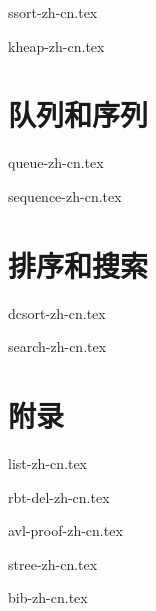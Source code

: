\documentclass[zihao=5, b5paper, twoside, heading=true]{ctexbook}
\begin{document}
{ssort-zh-cn.tex}

{kheap-zh-cn.tex}


\part{队列和序列}
{queue-zh-cn.tex}

{sequence-zh-cn.tex}

\part{排序和搜索}
{dcsort-zh-cn.tex}

{search-zh-cn.tex}

\part{附录}
\appendix
\noappendicestocpagenum
\addappheadtotoc

{list-zh-cn.tex}

{rbt-del-zh-cn.tex}

{avl-proof-zh-cn.tex}

{stree-zh-cn.tex}

{bib-zh-cn.tex}

%

\printindex
\end{document}
